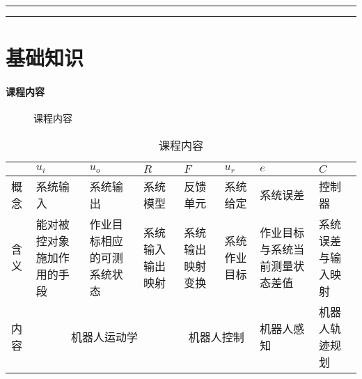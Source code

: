 \documentclass[
12pt, %
a4paper, 
oneside, %
headinclude,footinclude, %
]{scrartcl}
\title{\normalfont\spacedallcaps{智能工程}}
\date{}
\begin{document}
\maketitle
\newpage
\hypertarget{toc}{}
\begingroup
\begin{multicols}{2}
\tableofcontents
\end{multicols}
\endgroup
\newpage
\begingroup
\begin{multicols}{2}
\listoffigures
\end{multicols}
\endgroup
\hrule
\begingroup
\begin{multicols}{2}
\listoftables
\end{multicols}
\endgroup
\hrule
\begingroup
\begin{multicols}{2}
\listoftips
\end{multicols}
\endgroup
\newpage
\section{基础知识}
\paragraph{课程内容}
\begin{figure}[H]
\centering
{} \quad
{}
\caption[课程内容]{课程内容}
\end{figure}

\begin{table}[hbt]
\caption{课程内容}
\centering
\begin{tabular}{|p{0.5cm}|p{2cm}|p{2cm}|p{2cm}|p{2cm}|p{2cm}|p{2cm}|p{2cm}|}
\hline
& $ u_i $ & $ u_o $ & $ R $ & $ F $ & $ u_r $ & $ e $ & $ C $ \\
\hline
概念 & 系统输入 & 系统输出 & 系统模型 & 反馈单元 & 系统给定 & 系统误差 & 控制器 \\
\hline
含义 & 能对被控对象施加作用的手段 & 作业目标相应的可测系统状态 & 系统输入输出映射 & 系统输出映射变换 & 系统作业目标 & 作业目标与系统当前测量状态差值 & 系统误差与输入映射 \\
\hline
内容 & \multicolumn{3}{c|}{机器人运动学} & \multicolumn{2}{c|}{机器人控制} & 机器人感知 & 机器人轨迹规划 \\
\hline
\end{tabular}
\end{table}
\end{document}
